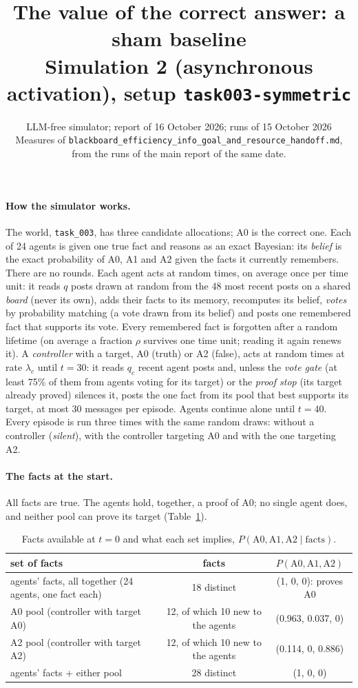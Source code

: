\documentclass[10pt,a4paper]{article}
\title{\vspace{-1.2cm}\textbf{The value of the correct answer: a sham baseline}\\[2pt]
\large Simulation 2 (asynchronous activation), setup \texttt{task003-symmetric}}
\author{LLM-free simulator; report of 16 October 2026; runs of 15 October 2026\\
\small Measures of \texttt{blackboard\_efficiency\_info\_goal\_and\_resource\_handoff.md}, from the runs of the main report of the same date.}
\date{}
\begin{document}
\maketitle
\vspace{-1cm}

\paragraph{How the simulator works.} The world, \texttt{task\_003}, has three candidate allocations; A0 is the
correct one. Each of 24 agents is given one true fact and reasons as an exact Bayesian: its \emph{belief} is the
exact probability of A0, A1 and A2 given the facts it currently remembers. There are no rounds. Each agent acts
at random times, on average once per time unit: it reads $q$ posts drawn at random from the 48 most recent posts
on a shared \emph{board} (never its own), adds their facts to its memory, recomputes its belief, \emph{votes} by
probability matching (a vote drawn from its belief) and posts one remembered fact that supports its vote. Every
remembered fact is forgotten after a random lifetime (on average a fraction $\rho$ survives one time unit; reading
it again renews it). A \emph{controller} with a target, A0 (truth) or A2 (false), acts at random times at rate
$\lambda_c$ until $t = 30$: it reads $q_c$ recent agent posts and, unless the \emph{vote gate} (at least 75\% of
them from agents voting for its target) or the \emph{proof stop} (its target already proved) silences it, posts
the one fact from its pool that best supports its target, at most 30 messages per episode. Agents continue
alone until $t = 40$. Every episode is run three times with the same random draws: without a controller
(\emph{silent}), with the controller targeting A0 and with the one targeting A2.

\paragraph{The facts at the start.} All facts are true. The agents hold, together, a proof of A0; no single
agent does, and neither pool can prove its target (Table~\ref{tab:facts}).

\begin{table}[H]
\centering\small
\caption{Facts available at $t = 0$ and what each set implies, $P(\text{A0}, \text{A1}, \text{A2} \mid \text{facts})$.}
\label{tab:facts}
\begin{tabular}{lcc}
\toprule
set of facts & facts & $P(\text{A0}, \text{A1}, \text{A2})$ \\
\midrule
agents' facts, all together (24 agents, one fact each) & 18 distinct & (1, 0, 0): proves A0 \\
A0 pool (controller with target A0) & 12, of which 10 new to the agents & (0.963, 0.037, 0) \\
A2 pool (controller with target A2) & 12, of which 10 new to the agents & (0.114, 0, 0.886) \\
agents' facts + either pool & 28 distinct & (1, 0, 0) \\
\bottomrule
\end{tabular}
\end{table}
\end{document}
